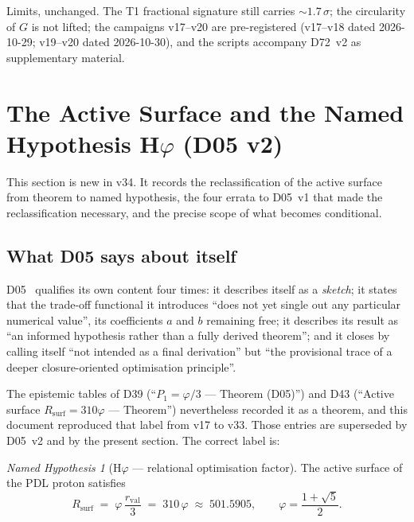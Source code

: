 \documentclass[11pt,a4paper]{article}
\theoremstyle{plain}
\theoremstyle{definition}
\theoremstyle{remark}
\newtheorem{namedhyp}[theorem]{Named Hypothesis}
\newcommand{\rval}{r_{\mathrm{val}}}
\newcommand{\Rsurf}{R_{\mathrm{surf}}}
\begin{document}
\textcolor{negativered}{Limits, unchanged.} The T1 fractional signature still carries $\sim1.7\,\sigma$; the circularity of $G$ is not lifted; the campaigns v17--v20 are pre-registered (v17--v18 dated 2026-10-29; v19--v20 dated 2026-10-30), and the scripts accompany D72~v2 as supplementary material.

\section{The Active Surface and the Named Hypothesis \texorpdfstring{H$\varphi$}{Hphi} (D05 v2)}
\label{sec:Hphi}

This section is new in v34. It records the reclassification of the active surface from theorem to named hypothesis, the four errata to D05~v1 that made the reclassification necessary, and the precise scope of what becomes conditional.

\subsection{What D05 says about itself}
\label{subsec:D05self}
D05~\cite{D05} qualifies its own content four times: it describes itself as a \emph{sketch}; it states that the trade-off functional it introduces ``does not yet single out any particular numerical value'', its coefficients $a$ and $b$ remaining free; it describes its result as ``an informed hypothesis rather than a fully derived theorem''; and it closes by calling itself ``not intended as a final derivation'' but ``the provisional trace of a deeper closure-oriented optimisation principle''.

\textcolor{negativered}{The epistemic tables of D39 (``$P_1=\varphi/3$ --- Theorem (D05)'') and D43 (``Active surface $\Rsurf=310\varphi$ --- Theorem'') nevertheless recorded it as a theorem, and this document reproduced that label from v17 to v33.} Those entries are superseded by D05~v2 and by the present section. The correct label is:

\begin{namedhyp}[H$\varphi$ --- relational optimisation factor]
\label{hyp:Hphi}
The active surface of the PDL proton satisfies
\[
\Rsurf \;=\; \varphi\,\frac{\rval}{3} \;=\; 310\,\varphi \;\approx\; 501.5905,
\qquad \varphi=\frac{1+\sqrt5}{2}.
\]
\end{namedhyp}
\end{document}
